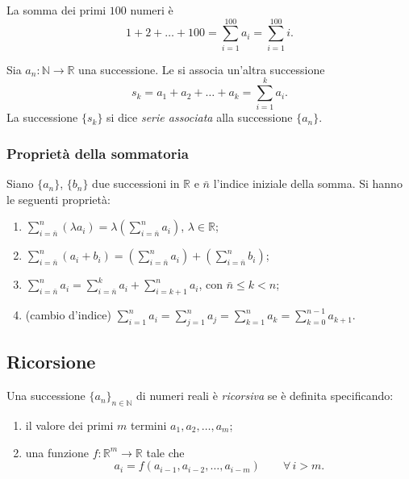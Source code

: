 \documentclass[11pt,a4paper]{article}
\begin{document}
\begin{esempio}
La somma dei primi $100$ numeri è
\[
1 + 2 + \dots + 100 = \sum_{i=1}^{100} a_i = \sum_{i=1}^{100} i .
\]
\end{esempio}

\begin{definizione}
Sia $a_n \colon \mathbb{N} \to \mathbb{R}$ una successione. Le si associa
un'altra successione
\[
s_k = a_1 + a_2 + \dots + a_k = \sum_{i=1}^{k} a_i .
\]
La successione $\{s_k\}$ si dice \emph{serie associata} alla successione
$\{a_n\}$.
\end{definizione}

\subsubsection{Proprietà della sommatoria}

\begin{proposizione}
Siano $\{a_n\}$, $\{b_n\}$ due successioni in $\mathbb{R}$ e $\bar n$ l'indice
iniziale della somma. Si hanno le seguenti proprietà:
\begin{enumerate}
    \item $\displaystyle \sum_{i=\bar n}^{n} (\lambda a_i)
          = \lambda \left( \sum_{i=\bar n}^{n} a_i \right)$, \quad
          $\lambda \in \mathbb{R}$;
    \item $\displaystyle \sum_{i=\bar n}^{n} (a_i + b_i)
          = \left( \sum_{i=\bar n}^{n} a_i \right)
          + \left( \sum_{i=\bar n}^{n} b_i \right)$;
    \item $\displaystyle \sum_{i=\bar n}^{n} a_i
          = \sum_{i=\bar n}^{k} a_i + \sum_{i=k+1}^{n} a_i$, \quad
          con $\bar n \leq k < n$;
    \item (cambio d'indice)
          $\displaystyle \sum_{i=1}^{n} a_i = \sum_{j=1}^{n} a_j
          = \sum_{k=1}^{n} a_k = \sum_{k=0}^{n-1} a_{k+1}$.
\end{enumerate}
\end{proposizione}

\subsection{Ricorsione}

\begin{definizione}
Una successione $\{a_n\}_{n \in \mathbb{N}}$ di numeri reali è
\emph{ricorsiva} se è definita specificando:
\begin{enumerate}
    \item il valore dei primi $m$ termini $a_1, a_2, \dots, a_m$;
    \item una funzione $f \colon \mathbb{R}^m \to \mathbb{R}$ tale che
          \[
            a_i = f(a_{i-1}, a_{i-2}, \dots, a_{i-m}) \qquad \forall\, i > m .
          \]
\end{enumerate}
\end{definizione}
\end{document}
